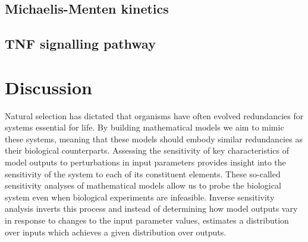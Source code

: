 \documentclass[10pt,letterpaper]{article}
\begin{document}
\subsection{Michaelis-Menten kinetics}

\subsection{TNF signalling pathway}



\section{Discussion}
\label{sec:discussion}

Natural selection has dictated that organisms have often evolved redundancies for systems essential for life. By building mathematical models we aim to mimic these systems, meaning that these models should embody similar redundancies as their biological counterparts. Assessing the sensitivity of key characteristics of model outputs to perturbations in input parameters provides insight into the sensitivity of the system to each of its constituent elements. These so-called sensitivity analyses of mathematical models allow us to probe the biological system even when biological experiments are infeasible. Inverse sensitivity analysis inverts this process and instead of determining how model outputs vary in response to changes to the input parameter values, estimates a distribution over inputs which achieves a given distribution over outputs.
\end{document}
